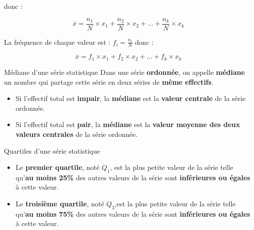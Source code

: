 \begin{pageCours}
{\begin{Pv}
donc : 

\[\overline{x}=\frac{n_1}{N}\times x_1+\frac{n_2}{N}\times x_2+\ldots+\frac{n_k}{N}\times x_k\]

La fréquence de chaque valeur est : $f_i=\frac{n_i}{N}$ donc :

\[\overline{x}=f_1\times x_1+f_2\times x_2+\ldots+f_k\times x_k\]
\end{Pv}
}

\begin{DefT}{Médiane d'une série statistique}
Dans une série \textbf{ordonnée}, on appelle \textbf{médiane} un nombre qui partage cette série en deux séries de \textbf{même effectifs}.
\begin{itemize}
\item Si l'effectif total est \textbf{impair}, la \textbf{médiane} est la \textbf{valeur centrale} de la série ordonnée.
\item Si l'effectif total est \textbf{pair}, la \textbf{médiane} est la \textbf{valeur moyenne des deux valeurs centrales} de la série ordonnée.
\end{itemize}
\end{DefT}

\begin{DefT}{Quartiles d'une série statistique}
\begin{itemize}
\item Le \textbf{premier quartile}, noté $Q_1$, est la plus petite valeur de la série telle qu'\textbf{au moins 25\%} des autres valeurs de la série sont \textbf{inférieures ou égales} à cette valeur.
\item Le \textbf{troisième quartile}, noté $Q_3$,est la plus petite valeur de la série telle qu'\textbf{au moins 75\%} des autres valeurs de la série sont \textbf{inférieures ou égales} à cette valeur.
\end{itemize}
\end{DefT}

\end{pageCours} %


